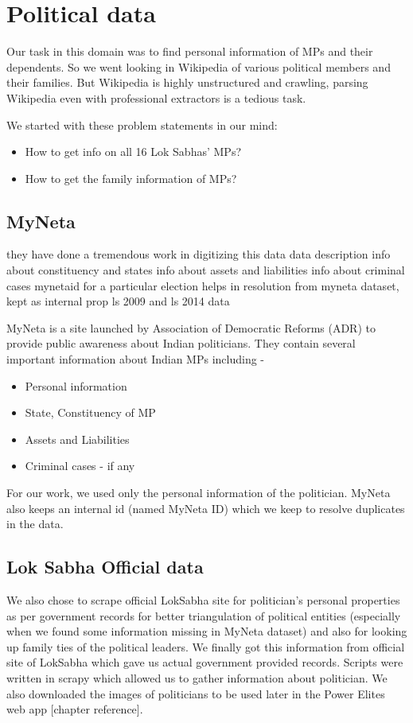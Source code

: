 \section{Political data}

Our task in this domain was to find personal information of MPs and their dependents. So we went looking in Wikipedia of various political members and their families. But Wikipedia is highly unstructured and crawling, parsing Wikipedia even with professional extractors is a tedious task.

We started with these problem statements in our mind:
\begin{itemize}
    \item How to get info on all 16 Lok Sabhas’ MPs?
    \item How to get the family information of MPs?
\end{itemize}
\subsection{MyNeta}

they have done a tremendous work in digitizing this data
data description
info about constituency and states 
info about assets and liabilities
info about criminal cases
mynetaid for a particular election helps in resolution from myneta dataset, kept as internal prop
ls 2009 and ls 2014 data

MyNeta is a site launched by Association of Democratic Reforms (ADR) to provide public awareness about Indian politicians. They contain several important information about Indian MPs including -
\begin{itemize}
    \item Personal information
    \item State, Constituency of MP
    \item Assets and Liabilities
    \item Criminal cases - if any
\end{itemize}
For our work, we used only the personal information of the politician. MyNeta also keeps an internal id (named MyNeta ID) which we keep to resolve duplicates in the data.

\subsection{Lok Sabha Official data}

We also chose to scrape official LokSabha site for politician's personal properties as per government records for better triangulation of political entities (especially when we found some information missing in MyNeta dataset) and also for looking up family ties of the political leaders.
We finally got this information from official site of LokSabha which gave us actual government provided records. Scripts were written in scrapy which allowed us to gather information about politician.
We also downloaded the images of politicians to be used later in the Power Elites web app [chapter reference].

